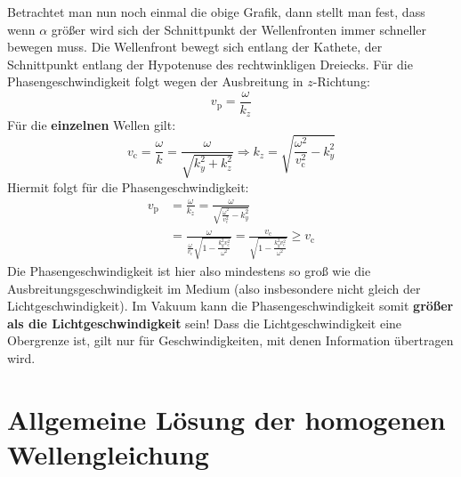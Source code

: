  Betrachtet man nun noch einmal die obige Grafik, dann stellt man fest, dass wenn $\alpha$ größer wird sich der Schnittpunkt der Wellenfronten immer schneller bewegen muss. Die Wellenfront bewegt sich entlang der Kathete, der Schnittpunkt entlang der Hypotenuse des rechtwinkligen Dreiecks. Für die Phasengeschwindigkeit folgt wegen der Ausbreitung in $z$-Richtung: \begin{equation*}
  	v_\mathrm{p} = \dfrac{\omega}{ k_z}
  \end{equation*}  
   Für die \textbf{einzelnen} Wellen gilt:
    \begin{equation*}
  v_\mathrm{c} = \dfrac{\omega}{ k} = \dfrac{\omega}{\sqrt{ k_y^2+ k_z^2}} \Rightarrow  k_z = \sqrt{\dfrac{\omega^2}{ v_\mathrm{c}^2}- k_y^2 }
  \end{equation*} 
		 Hiermit folgt für die Phasengeschwindigkeit:
		        \begin{equation*}\begin{split}
				        v_\mathrm{p} & = \frac{\omega}{ k_z} = \frac{\omega}{\sqrt{\frac{\omega^2}{ v_\mathrm{c}^2}- k_y^2 }} \\
				        & = \frac{\omega}{\frac{\omega}{ v_\mathrm{c}}\sqrt{1-\frac{ k_y^2  v_\mathrm{c}^2}{\omega^2} }} = \frac{ v_\mathrm{c}}{\sqrt{1-\frac{ k_y^2  v_\mathrm{c}^2}{\omega^2} }} \ge  v_\mathrm{c}
			        \end{split}\end{equation*}
		   Die Phasengeschwindigkeit ist hier also mindestens so groß wie die Ausbreitungsgeschwindigkeit im Medium (also insbesondere nicht gleich der Lichtgeschwindigkeit). Im Vakuum kann die Phasengeschwindigkeit somit \textbf{größer als die Lichtgeschwindigkeit} sein! Dass die Lichtgeschwindigkeit eine Obergrenze ist, gilt nur für Geschwindigkeiten, mit denen Information übertragen wird.
 \section{Allgemeine Lösung der homogenen Wellengleichung}
